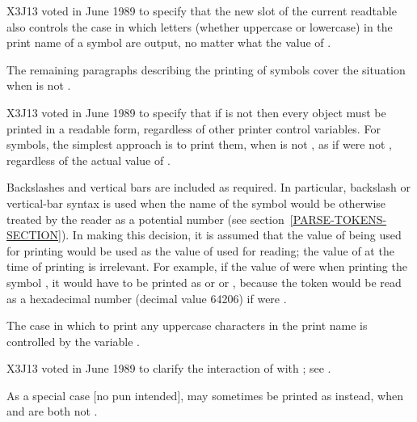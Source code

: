 \begin{flushdesc}
\begin{newer}
X3J13 voted in June 1989 
to specify that the new  slot of the current readtable
also controls the case in which letters (whether uppercase or lowercase)
in the print name of a symbol are output, no matter what the value of .
\end{newer}

\begin{obsolete}
The remaining paragraphs describing the printing of symbols cover
the situation when  is not {\false}.
\end{obsolete}

\begin{newer}
X3J13 voted in June 1989  to specify that if 
is not {\false} then every object must be printed in a readable form,
regardless of other printer control variables.
For symbols, the simplest approach
is to print them, when  is not {\false}, as if 
were not {\false}, regardless of the actual value of .
\end{newer}

Backslashes \cd{{\Xbackslash}} and
vertical bars \cd{|} are included as required.  In particular,
backslash or vertical-bar syntax is used when the name of
the symbol would be otherwise treated by the reader as a potential number
(see section~\ref{PARSE-TOKENS-SECTION}).
In making this decision, it is assumed that the value of 
being used for printing would be used as the value of 
used for reading; the value of  at the time of printing
is irrelevant.  For example, if the value of  were 
when printing the symbol , it would have to be printed as
 or  or , because the token
 would be read as a hexadecimal
number (decimal value 64206) if  were .

\begin{obsolete}
The case in which to print any
uppercase characters in the print name is controlled by the
variable .
\end{obsolete}
\begin{newer}
X3J13 voted in June 1989 
to clarify the interaction of  with ;
see .
\end{newer}
As a special case [no pun intended], {\nil} may sometimes be printed as \cd{()} instead,
when  and  are both not {\false}.


\end{flushdesc}

